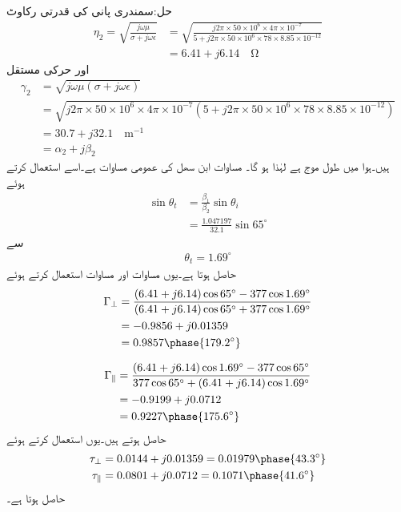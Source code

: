 حل:سمندری پانی کی قدرتی رکاوٹ
\begin{align*}
\eta_2=\sqrt{\frac{j\omega \mu}{\sigma+j\omega \epsilon}}&=\sqrt{\frac{j 2\pi \times 50\times 10^6\times 4 \pi \times 10^{-7}}{5+j 2\pi\times 50 \times 10^6 \times 78\times 8.85\times 10^{-12}}}\\
&=6.41+j6.14  \quad \si{\ohm}
\end{align*}
اور حرکی مستقل
\begin{align*}
\gamma_2&=\sqrt{j\omega \mu(\sigma+j\omega \epsilon)}\\
&=\sqrt{j 2\pi \times 50\times 10^6\times 4 \pi \times 10^{-7}(5+j 2\pi\times 50 \times 10^6 \times 78\times 8.85\times 10^{-12})}\\
&=30.7+j 32.1 \quad \si{\meter^{-1}}\\
&=\alpha_2+j\beta_2
\end{align*}
ہیں۔ہوا میں طول موج  ہے لہٰذا  ہو گا۔ مساوات  ابن سھل کی عمومی مساوات ہے۔اسے استعمال کرتے ہوئے
\begin{align*}
\sin \theta_t&=\frac{\beta_1}{\beta_2} \sin \theta_i\\
&=\frac{1.047197}{32.1} \sin 65^{\circ}
\end{align*}
سے
\begin{align*}
\theta_t=1.69^{\circ}
\end{align*}
حاصل ہوتا ہے۔یوں مساوات  اور مساوات  استعمال کرتے ہوئے
\begin{align*}
\Gamma_{\perp}&=\frac{(6.41+j6.14) \cos 65^{\circ} -377 \cos 1.69^{\circ}}{(6.41+j6.14) \cos 65^{\circ} +377 \cos 1.69^{\circ}}\\
&=-0.9856+j0.01359\\
&=0.9857\phase{179.2^{\circ}}
\end{align*}

\begin{align*}
\Gamma_{\parallel} &=\frac{(6.41+j6.14) \cos 1.69^{\circ} -377 \cos 65^{\circ}}{377 \cos 65^{\circ}+(6.41+j6.14) \cos 1.69^{\circ}}\\
&=-0.9199+j0.0712\\
&=0.9227\phase{175.6^{\circ}}
\end{align*}
حاصل ہوتے ہیں۔یوں  استعمال کرتے ہوئے
\begin{align*}
\tau_{\perp}&=0.0144+j0.01359=0.01979\phase{43.3^{\circ}}\\
\tau_{\parallel}&=0.0801+j0.0712=0.1071\phase{41.6^{\circ}}
\end{align*}
حاصل ہوتا ہے۔

